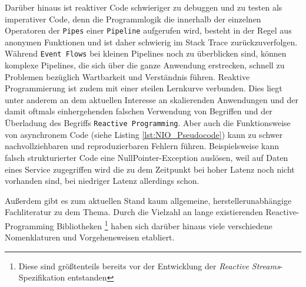 Darüber hinaus ist reaktiver Code schwieriger zu debuggen und zu testen als imperativer Code, denn die Programmlogik die innerhalb der einzelnen Operatoren
der \verb|Pipes| einer \verb|Pipeline| aufgerufen wird, besteht in der Regel aus anonymen Funktionen und ist daher schwierig im Stack Trace zurückzuverfolgen.
Während \verb|Event Flows| bei kleinen Pipelines noch zu überblicken sind, können komplexe Pipelines, die sich über die ganze Anwendung erstrecken,
schnell zu Problemen bezüglich Wartbarkeit und Verständnis führen.
Reaktive Programmierung ist zudem mit einer steilen Lernkurve verbunden. Dies liegt unter anderem an dem aktuellen Interesse an skalierenden
Anwendungen und der damit oftmals einhergehenden falschen Verwendung von Begriffen und der Überladung des Begriffs \verb|Reactive Programming|.
Aber auch die Funktionsweise von asynchronem Code (siehe Listing \ref{lst:NIO_Pseudocode}) kann zu schwer nachvollziehbaren und
reproduzierbaren Fehlern führen. Beispielsweise kann falsch strukturierter Code eine NullPointer-Exception auslösen, weil
auf Daten eines Service zugegriffen wird die zu dem Zeitpunkt bei hoher Latenz noch nicht vorhanden sind, bei niedriger Latenz
allerdings schon.

Außerdem gibt es zum aktuellen Stand kaum allgemeine, herstellerunabhängige Fachliteratur zu dem Thema.
Durch die Vielzahl an lange existierenden Reactive-Programming Bibliotheken
\footnote{Diese sind größtenteils bereits vor der Entwicklung der \textit{Reactive Streams}-Spezifikation entstanden}
haben sich darüber hinaus viele verschiedene Nomenklaturen und Vorgehensweisen etabliert.

